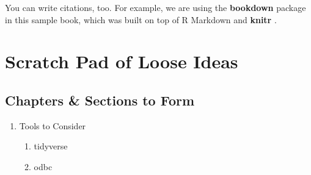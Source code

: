 \documentclass[]{book}
\providecommand{\tightlist}{%
  \setlength{\itemsep}{0pt}\setlength{\parskip}{0pt}}
\theoremstyle{definition}
\theoremstyle{definition}
\theoremstyle{definition}
\theoremstyle{remark}
\begin{document}
You can write citations, too. For example, we are using the
\textbf{bookdown} package \citep{R-bookdown} in this sample book, which
was built on top of R Markdown and \textbf{knitr} \citep{xie2015}.

\hypertarget{scratch-pad-of-loose-ideas}{%
\chapter{Scratch Pad of Loose Ideas}\label{scratch-pad-of-loose-ideas}}

\hypertarget{chapters-sections-to-form}{%
\section{Chapters \& Sections to Form}\label{chapters-sections-to-form}}

\begin{enumerate}
\def\labelenumi{\arabic{enumi}.}
\tightlist
\item
  Tools to Consider

  \begin{enumerate}
  \def\labelenumii{\arabic{enumii}.}
  \tightlist
  \item
    tidyverse
  \item
    odbc
  \end{enumerate}
\end{enumerate}


\end{document}
